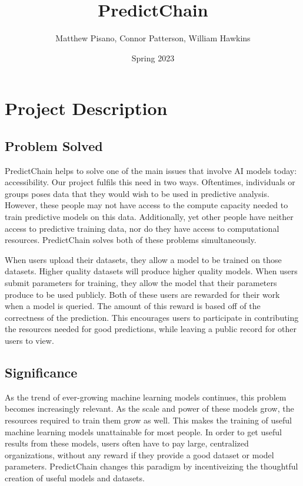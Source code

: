 \documentclass{article}
\title{PredictChain}
\author{Matthew Pisano, Connor Patterson, William Hawkins}
\date{Spring 2023}
\begin{document}
    \maketitle

    \section{Project Description}

    \subsection{Problem Solved}

    PredictChain helps to solve one of the main issues that involve AI models today: accessibility.  Our project fulfils this
    need in two ways.  Oftentimes, individuals or groups poses data that they would wish to be used in predictive analysis.
    However, these people may not have access to the compute capacity needed to train predictive models on this data.  Additionally,
    yet other people have neither access to predictive training data, nor do they have access to computational resources.
    PredictChain solves both of these problems simultaneously.

    When users upload their datasets, they allow a model to be trained on those datasets.  Higher quality datasets will produce
    higher quality models.  When users submit parameters for training, they allow the model that their parameters produce to
    be used publicly.  Both of these users are rewarded for their work when a model is queried.  The amount of this reward
    is based off of the correctness of the prediction.  This encourages users to participate in contributing the
    resources needed for good predictions, while leaving a public record for other users to view.

    \subsection{Significance}

    As the trend of ever-growing machine learning models continues, this problem becomes increasingly relevant.
    As the scale and power of these models grow, the resources required to train them grow as well.  This makes the training
    of useful machine learning models unattainable for most people.  In order to get useful results from these models,
    users often have to pay large, centralized organizations, without any reward if they provide a good dataset or model
    parameters.  PredictChain changes this paradigm by incentiveizing the thoughtful creation of useful models and
    datasets.
\end{document}
